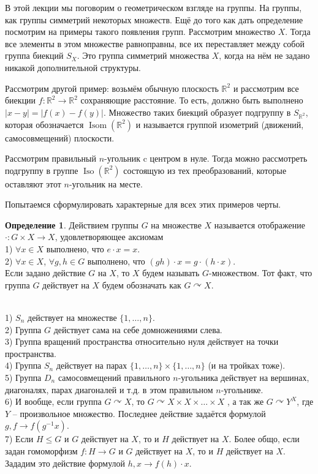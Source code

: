 \documentclass[10pt,a4paper,oneside]{book}
\theoremstyle{definition}
\newtheorem*{defn}{\color{yellow!30!red} Определение}
\renewcommand{\leq}{\leqslant}
\newcommand{\mb}[1]{\mathbb{#1}}
\newcommand{\Iso}{\operatorname{Iso}}
\newcommand{\Isom}{\operatorname{Isom}}
\def\exm{\noindent {\bf Примеры:}}
\begin{document}
В этой лекции мы поговорим о геометрическом взгляде на группы. На группы, как группы симметрий некоторых множеств. Ещё до того как дать определение посмотрим на примеры такого появления групп. Рассмотрим множество $X$. Тогда все элементы в этом множестве равноправны, все их переставляет между собой группа биекций $S_X$. Это группа симметрий множества $X$, когда на нём не задано никакой дополнительной структуры. 

Рассмотрим другой пример: возьмём обычную плоскость $\mb R^2$ и рассмотрим все биекции $f\colon \mb R^2 \to \mb R^2$ сохраняющие расстояние. То есть, должно быть выполнено $|x-y|=|f(x)-f(y)|$. Множество таких биекций образует подгруппу в $S_{\mb R^2}$, которая обозначается $\Isom(\mb R^2)$ и называется группой изометрий (движений, самосовмещений) плоскости. 

Рассмотрим правильный $n$-угольник c  центром в нуле. Тогда можно рассмотреть подгруппу в группе $\Iso (\mb R^2)$ состоящую из тех преобразований, которые оставляют этот $n$-угольник на месте. 

Попытаемся сформулировать характерные для всех этих примеров черты.


\begin{defn}
Действием группы $G$ на множестве $X$ называется отображение $\cdot \colon G\times X\to X$, удовлетворяющее аксиомам\\
1) $\forall x \in X$  выполнено, что $e\cdot x=x$.\\
2) $\forall x \in X$, $\forall g,h\in G$ выполнено, что $(gh)\cdot x= g\cdot (h\cdot x)$.\\
Если задано действие $G$ на $X$, то $X$ будем называть $G$-множеством. Тот факт, что группа $G$ действует на $X$ будем обозначать как $G \curvearrowright X$. 
\end{defn}


\exm \\
1) $S_n$ действует на множестве $\{1,\dots,n\}$.\\
2) Группа $G$ действует сама на себе домножениями слева.\\
3) Группа вращений пространства относительно нуля действует на точки пространства.\\
4) Группа $S_n$ действует на парах $\{1,\dots,n\}\times \{1,\dots,n\}$ (и на тройках тоже).\\
5) Группа $D_n$ самосовмещений правильного $n$-угольника действует на вершинах, диагоналях, парах диагоналей и т.д. в этом правильном $n$-угольнике.\\
6) И вообще, если группа $G\curvearrowright X$, то $G \curvearrowright X\times X\times \dots \times X$ , а так же $G \curvearrowright Y^X$, где $Y$ -- произвольное множество. Последнее действие задаётся формулой $g,f \to f(g^{-1}x)$.\\
7) Если $H\leq G$ и $G$ действует на $X$, то и $H$ действует на $X$. Более общо, если задан гомоморфизм $f\colon H \to G$ и $G$ действует на $X$, то и $H$ действует на $X$. Зададим это действие формулой $h,x \to f(h)\cdot x$.\\
\end{document}
